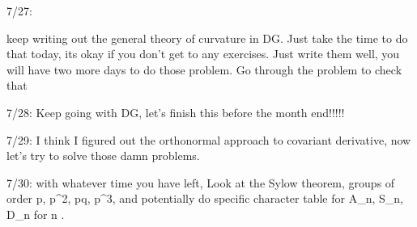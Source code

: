 7/27:

keep writing out the general theory of curvature in DG. Just take the time to do that today, its okay if you don't get to any exercises. Just write them well, you will have two more days to do those problem. Go through the problem to check that 


7/28: Keep going with DG, let's finish this before the month end!!!!!

7/29: I think I figured out the orthonormal approach to covariant derivative, now let's try to solve those damn problems.



7/30: with whatever time you have left, Look at the Sylow theorem, groups of order p, p^2, pq, p^3, and potentially do specific character table for A_n, S_n, D_n for n . 
